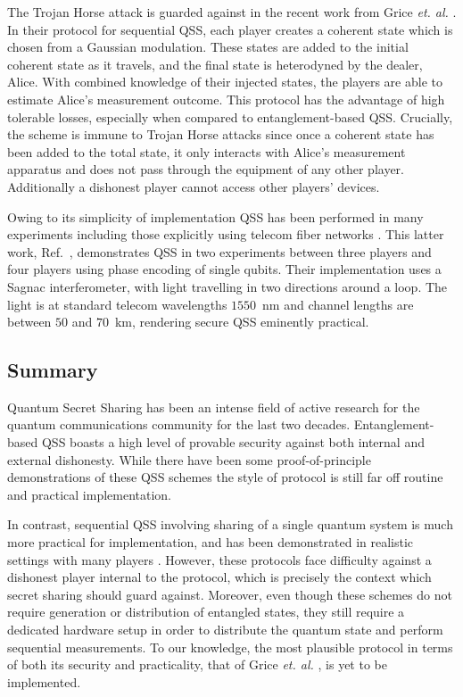 The Trojan Horse attack is guarded against in the recent work from Grice \emph{et. al.} \cite{Grice2019}. In their protocol for sequential QSS, each player creates a coherent state which is chosen from a Gaussian modulation. These states are added to the initial coherent state as it travels, and the final state is heterodyned by the dealer, Alice. With combined knowledge of their injected states, the players are able to estimate Alice's measurement outcome. This protocol has the advantage of high tolerable losses, especially when compared to entanglement-based QSS. Crucially, the scheme is immune to Trojan Horse attacks since once a coherent state has been added to the total state, it only interacts with Alice's measurement apparatus and does not pass through the equipment of any other player. Additionally a dishonest player cannot access other players' devices.

Owing to its simplicity of implementation QSS has been performed in many experiments \cite{Schmid2005, Hai-Qiang2013a} including those explicitly using telecom fiber networks \cite{Bogdanski2009}. This latter work, Ref.~\cite{Bogdanski2009}, demonstrates QSS in two experiments between three players and four players using phase encoding of single qubits. Their implementation uses a Sagnac interferometer, with light travelling in two directions around a loop. The light is at standard telecom wavelengths $1550$~nm and channel lengths are between $50$ and $70$~km, rendering secure QSS eminently practical.


\subsection{Summary}
Quantum Secret Sharing has been an intense field of active research for the quantum communications community for the last two decades. Entanglement-based QSS boasts a high level of provable security against both internal and external dishonesty. While there have been some proof-of-principle demonstrations of these QSS schemes \cite{Gaertner2007, Bell2014, Tittel2001, Chen2005b} the style of protocol is still far off routine and practical implementation.

In contrast, sequential QSS involving sharing of a single quantum system is much more practical for implementation, and has been demonstrated in realistic settings with many players \cite{Schmid2005, Bogdanski2009, Hai-Qiang2013a}. However, these protocols face difficulty against a dishonest player internal to the protocol, which is precisely the context which secret sharing should guard against. Moreover, even though these schemes do not require generation or distribution of entangled states, they still require a dedicated hardware setup in order to distribute the quantum state and perform sequential measurements. To our knowledge, the most plausible protocol in terms of both its security and practicality, that of Grice \emph{et. al.} \cite{Grice2019}, is yet to be implemented. 


